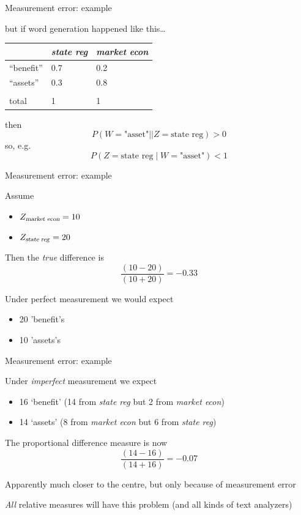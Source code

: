 \documentclass{hertieteaching}
\begin{document}
\begin{frame}{Measurement error: example}
\protect\hypertarget{measurement-error-example-1}{}

but if word generation happened like this\ldots{}

\begin{longtable}[]{@{}lll@{}}
\toprule
& \emph{state reg} & \emph{market econ}\tabularnewline
\midrule
\endhead
``benefit'' & 0.7 & 0.2\tabularnewline
``assets'' & 0.3 & 0.8\tabularnewline
& &\tabularnewline
total & 1 & 1\tabularnewline
\bottomrule
\end{longtable}

then \[
P(W=\text{"asset"} |\mid Z=\text{state reg}) > 0
\]
so, e.g.
\[
P(Z=\text{state reg} \mid W=\text{"asset"}) < 1
\]

\end{frame}

\begin{frame}{Measurement error: example}
\protect\hypertarget{measurement-error-example-2}{}

Assume

\begin{itemize}
\item
  \(Z_{\text{\textsl{market econ}}} = 10\)\item
  \(Z_{\text{\textsl{state reg}}}=20\)
\end{itemize}

Then the \emph{true} difference is \[\frac{(10-20)}{(10+20)} = -0.33\]

Under perfect measurement we would expect

\begin{itemize}
\item
  20 'benefit's\item
  10 'assets's
\end{itemize}

\end{frame}

\begin{frame}{Measurement error: example}
\protect\hypertarget{measurement-error-example-3}{}

Under \emph{imperfect} measurement we expect

\begin{itemize}
\item
  16 `benefit' (14 from \emph{state reg} but 2 from \emph{market econ})\item
  14 `assets' (8 from \emph{market econ} but 6 from \emph{state reg})
\end{itemize}

The proportional difference measure is now \[
\frac{(14-16)}{(14+16)} = -0.07
\]

Apparently much closer to the centre, but only because of measurement
error

\pause

\emph{All} relative measures will have this problem (and all kinds of
text analyzers)

\end{frame}
\end{document}
